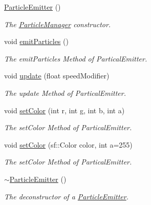 \begin{DoxyCompactItemize}
\item 
\hypertarget{class_particle_emitter_a31313702250800a4e074286b8e5d5116}{\hyperlink{class_particle_emitter_a31313702250800a4e074286b8e5d5116}{Particle\+Emitter} ()}\label{class_particle_emitter_a31313702250800a4e074286b8e5d5116}

\begin{DoxyCompactList}\small\item\em The \hyperlink{class_particle_manager}{Particle\+Manager} constructor. \end{DoxyCompactList}\item 
void \hyperlink{class_particle_emitter_a59e863f0386f1de946bb5f5a2eef3358}{emit\+Particles} ()
\begin{DoxyCompactList}\small\item\em The emit\+Particles Method of Partical\+Emitter. \end{DoxyCompactList}\item 
void \hyperlink{class_particle_emitter_a1567fd71b41c71b56ee8b72c5bca559c}{update} (float speed\+Modifier)
\begin{DoxyCompactList}\small\item\em The update Method of Partical\+Emitter. \end{DoxyCompactList}\item 
void \hyperlink{class_particle_emitter_aa639c76a4637bba568a407f69e1c8ebd}{set\+Color} (int r, int g, int b, int a)
\begin{DoxyCompactList}\small\item\em The set\+Color Method of Partical\+Emitter. \end{DoxyCompactList}\item 
void \hyperlink{class_particle_emitter_ac2d2189e309f8e557b214963aeb8aef8}{set\+Color} (sf\+::\+Color color, int a=255)
\begin{DoxyCompactList}\small\item\em The set\+Color Method of Partical\+Emitter. \end{DoxyCompactList}\item 
\hypertarget{class_particle_emitter_a6f4952f7555ede99d74d42b30c80f3e2}{\hyperlink{class_particle_emitter_a6f4952f7555ede99d74d42b30c80f3e2}{$\sim$\+Particle\+Emitter} ()}\label{class_particle_emitter_a6f4952f7555ede99d74d42b30c80f3e2}

\begin{DoxyCompactList}\small\item\em The deconstructor of a \hyperlink{class_particle_emitter}{Particle\+Emitter}. \end{DoxyCompactList}\end{DoxyCompactItemize}
